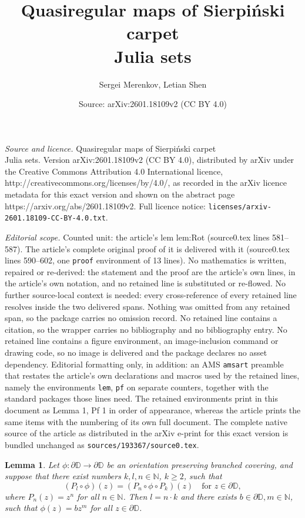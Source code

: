 \documentclass[10pt,a4paper]{amsart}
\title{Quasiregular maps of Sierpi\'nski carpet\\ Julia sets}
\author{Sergei Merenkov, Letian Shen}
\date{Source: arXiv:2601.18109v2 (CC BY 4.0)}
\newtheorem{lem}{Lemma}
\newcommand{\D}{\mathbb{D}}
\newcommand{\N}{\mathbb{N}}
\newcommand{\co}{\colon}
\newcommand{\ra}{\rightarrow}
\begin{document}
\maketitle

\noindent\emph{Source and licence.} Quasiregular maps of Sierpi\'nski carpet\\ Julia sets. Version arXiv:2601.18109v2 (CC BY 4.0), distributed by arXiv under the Creative Commons Attribution 4.0 International licence, http://creativecommons.org/licenses/by/4.0/, as recorded in the arXiv licence metadata for this exact version and shown on the abstract page https://arxiv.org/abs/2601.18109v2. Full licence notice: \texttt{licenses/arxiv-2601.18109-CC-BY-4.0.txt}.\par\smallskip

\noindent\textit{Editorial scope.} Counted unit: the article's lem lem:Rot (source0.tex lines 581--587). The article's complete original proof of it is delivered with it (source0.tex lines 590--602, one \texttt{proof} environment of 13 lines). No mathematics is written, repaired or re-derived: the statement and the proof are the article's own lines, in the article's own notation, and no retained line is substituted or re-flowed.  No further source-local context is needed: every cross-reference of every retained line resolves inside the two delivered spans.  Nothing was omitted from any retained span, so the package carries no omission record.  No retained line contains a citation, so the wrapper carries no bibliography and no bibliography entry.  No retained line contains a figure environment, an image-inclusion command or drawing code, so no image is delivered and the package declares no asset dependency.  Editorial formatting only, in addition: an AMS \texttt{amsart} preamble that restates the article's own declarations and macros used by the retained lines, namely the environments \texttt{lem}, \texttt{pf} on separate counters, together with the standard packages those lines need.  The retained environments print in this document as Lemma 1, Pf 1 in order of appearance, whereas the article prints the same items with the numbering of its own full document.  The complete native source of the article as distributed in the arXiv e-print for this exact version is bundled unchanged as \texttt{sources/193367/source0.tex}.
\begin{lem} \label{lem:Rot} Let $\phi\co\partial \D \ra \partial \D$ be an orientation preserving branched covering, and suppose that there   exist numbers $k,l,n\in \N$, $k\ge 2$, such that 
\begin{equation} \label{eq:basiceq}
(P_l\circ \phi)(z)= (P_n\circ \phi\circ P_k)(z) \quad \text{for $z\in \partial \D$},
\end{equation}
where $P_n(z)=z^n$ for all $n\in\N$.
Then $l=n\cdot k$  and there exists  $b\in \partial \D, m\in \N$,  such that $\phi(z)=bz^m$ for all $z\in \partial \D$.
\end{lem}
\end{document}

